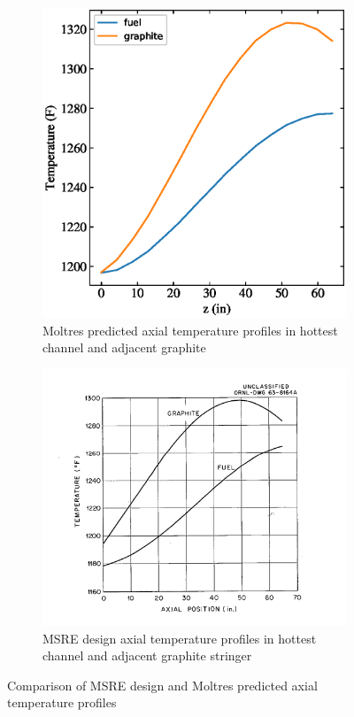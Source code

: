 \documentclass{article}
\makeatletter
\def\maxwidth#1{\ifdim\Gin@nat@width>#1 #1\else\Gin@nat@width\fi}
\makeatother
\begin{document}
\begin{figure}[htpb]
    \centering
    \begin{subfigure}[b]{.5\textwidth}
      \includegraphics[width=\maxwidth{\textwidth}]{fuel_vs_moderator_axial_sweep.eps}
      \caption{Moltres predicted axial temperature profiles in hottest channel
        and adjacent graphite}
      \label{fig:moltres_axial_temps}
    \end{subfigure}
    \begin{subfigure}[b]{.5\textwidth}
      \includegraphics[width=\maxwidth{\textwidth}]{msre_axial_temps.png}
      \caption{\gls{MSRE} design axial temperature profiles in hottest channel
        and adjacent graphite stringer \cite[p. 99]{briggs_molten-salt_1964}}
      \label{fig:msre_axial_temps}
    \end{subfigure}
    \caption{Comparison of \gls{MSRE} design and Moltres predicted axial
      temperature profiles}
    \label{fig:temp_compare}
\end{figure}
\end{document}
